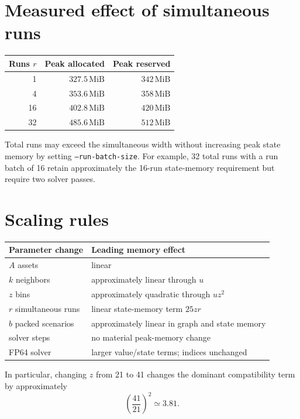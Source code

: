 \documentclass[10pt,a4paper]{article}
\newcommand{\MiB}{\,\mathrm{MiB}}
\begin{document}
\section*{Measured effect of simultaneous runs}

\begin{center}
\begin{tabular}{@{}r rr@{}}
\toprule
Runs $r$ & Peak allocated & Peak reserved \\
\midrule
1  & $327.5\MiB$ & $342\MiB$ \\
4  & $353.6\MiB$ & $358\MiB$ \\
16 & $402.8\MiB$ & $420\MiB$ \\
32 & $485.6\MiB$ & $512\MiB$ \\
\bottomrule
\end{tabular}
\end{center}

Total runs may exceed the simultaneous width without increasing peak state
memory by setting \texttt{--run-batch-size}.  For example, 32 total runs with a
run batch of 16 retain approximately the 16-run state-memory requirement but
require two solver passes.

\section*{Scaling rules}

\begin{center}
\begin{tabular}{@{}ll@{}}
\toprule
Parameter change & Leading memory effect \\
\midrule
$A$ assets & linear \\
$k$ neighbors & approximately linear through $u$ \\
$z$ bins & approximately quadratic through $uz^2$ \\
$r$ simultaneous runs & linear state-memory term $25zr$ \\
$b$ packed scenarios & approximately linear in graph and state memory \\
solver steps & no material peak-memory change \\
FP64 solver & larger value/state terms; indices unchanged \\
\bottomrule
\end{tabular}
\end{center}

In particular, changing $z$ from 21 to 41 changes the dominant compatibility
term by approximately
\begin{equation}
  \left(\frac{41}{21}\right)^2 \simeq 3.81.
\end{equation}
\end{document}
